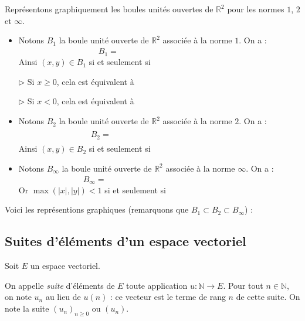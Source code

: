 \documentclass[french,11pt,twoside]{VcCours}
\begin{document}
\begin{Exemple} Représentons graphiquement les boules unités ouvertes de $\mathbb{R}^2$ pour les normes $1$, $2$ et $\infty$.

\begin{itemize}
\item Notons $B_1$ la boule unité ouverte de $\mathbb{R}^2$ associée à la norme $1$. On a :
$$ B_1 = \phantom{\lbrace (x,y) \in \mathbb{R}^2, \, \vert \, \vert x\vert + \vert y \vert <1 \rbrace}$$
Ainsi $(x,y) \in B_1$ si et seulement si \phantom{$-1- \vert x \vert < y < 1- \vert x \vert$.}

$\rhd$ Si $x \geq 0$, cela est équivalent à \phantom{$-1-x < y < 1-x$.}

$\rhd$ Si $x<0$, cela est équivalent à \phantom{$-1+x<y<1+x$.}
\item Notons $B_2$ la boule unité ouverte de $\mathbb{R}^2$ associée à la norme $2$. On a :
$$ B_2 = \phantom{\lbrace (x,y) \in \mathbb{R}^2, \, \vert \, \sqrt{\vert x\vert^2 + \vert y \vert^2} <1\rbrace} $$
Ainsi $(x,y) \in B_2$ si et seulement si \phantom{$\vert x\vert^2 + \vert y \vert^2<1$. }
\item Notons $B_{\infty}$ la boule unité ouverte de $\mathbb{R}^2$ associée à la norme $\infty$. On a :
$$ B_{\infty} = \phantom{\lbrace (x,y) \in \mathbb{R}^2, \, \max{(\vert x \vert, \vert y \vert)} <1 \rbrace}$$
Or $\max{(\vert x \vert, \vert y \vert)} <1$ si et seulement si \phantom{$\vert x \vert <1$ et $\vert y \vert <1$.}
\end{itemize}

\medskip

Voici les représentions graphiques (remarquons que $B_1 \subset B_2 \subset B_{\infty}$) :

\vspace*{4cm}
\end{Exemple}

\subsection{Suites d'éléments d'un espace vectoriel}

\begin{Definition}{} Soit $E$ un espace vectoriel. 

On appelle \emph{suite} d'éléments de $E$ toute application $u : \mathbb{N} \rightarrow E$. Pour tout $n \in \mathbb{N}$, on note $u_n$ au lieu de $u(n)$ : ce vecteur est le terme de rang $n$ de cette suite. On note la suite $(u_n)_{ n \geq 0}$ ou $(u_n)$.
\end{Definition}
\end{document}
